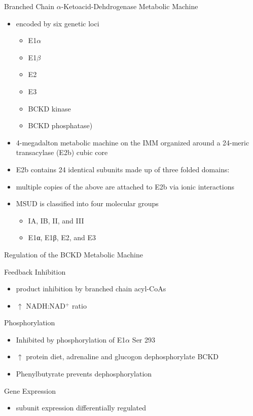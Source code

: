 \documentclass[presentation, smaller]{beamer}
\begin{document}
\begin{frame}[label={sec:orgheadline9}]{Branched Chain \(\alpha\)-Ketoacid-Dehdrogenase Metabolic Machine}
\begin{itemize}
\item encoded by six genetic loci
\begin{itemize}
\item E1\(\alpha\)
\item E1\(\beta\)
\item E2
\item E3
\item BCKD kinase
\item BCKD phosphatase)
\end{itemize}

\item 4-megadalton metabolic machine on the IMM organized around a 24-meric
transacylase (E2b) cubic core
\item E2b contains 24 identical subunits made up of three folded domains:
\item multiple copies of the above are attached to E2b via ionic interactions
\item MSUD is classified into four molecular groups
\begin{itemize}
\item IA, IB, II, and III
\item E1α, E1β, E2, and E3
\end{itemize}
\end{itemize}
\end{frame}

\begin{frame}[label={sec:orgheadline10}]{Regulation of the BCKD Metabolic Machine}
\begin{block}{Feedback Inhibition}
\begin{itemize}
\item product inhibition by branched chain acyl-CoAs
\item \(\uparrow\) NADH:NAD\(^{\text{+}}\) ratio
\end{itemize}
\end{block}
\begin{block}{Phosphorylation}
\begin{itemize}
\item Inhibited by phosphorylation of E1\(\alpha\) Ser 293
\item \(\uparrow\) protein diet, adrenaline and glucogon dephosphorylate BCKD
\item Phenylbutyrate prevents dephosphorylation
\end{itemize}
\end{block}
\begin{block}{Gene Expression}
\begin{itemize}
\item subunit expression differentially regulated
\end{itemize}
\end{block}
\end{frame}
\end{document}

